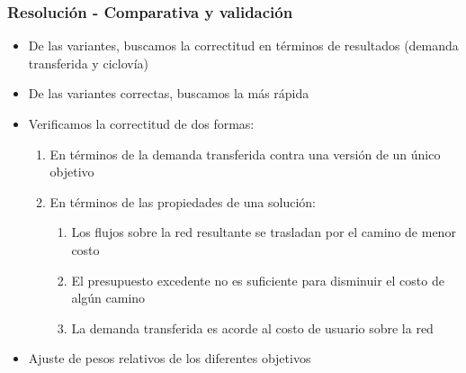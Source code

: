 \documentclass[aspectratio=43, 10pt]{beamer}
\begin{document}
\begin{frame}
    \frametitle{Resolución - Comparativa y validación}

    \begin{itemize}
        \item{De las variantes, buscamos la correctitud en términos de resultados (demanda transferida y ciclovía)}
        \item{De las variantes correctas, buscamos la más rápida}
        \item{Verificamos la correctitud de dos formas:
             \begin{enumerate}
                \item{En términos de la demanda transferida contra una versión de un único objetivo}
                \item{En términos de las propiedades de una solución:
                    \begin{enumerate}
                        \item{Los flujos sobre la red resultante se trasladan por el camino de menor costo}
                        \item{El presupuesto excedente no es suficiente para disminuir el costo de algún camino}
                        \item{La demanda transferida es acorde al costo de usuario sobre la red}
                    \end{enumerate}
                }
            \end{enumerate}
        }
    \item{Ajuste de pesos relativos de los diferentes objetivos}
    \end{itemize}
\end{frame}
\end{document}

